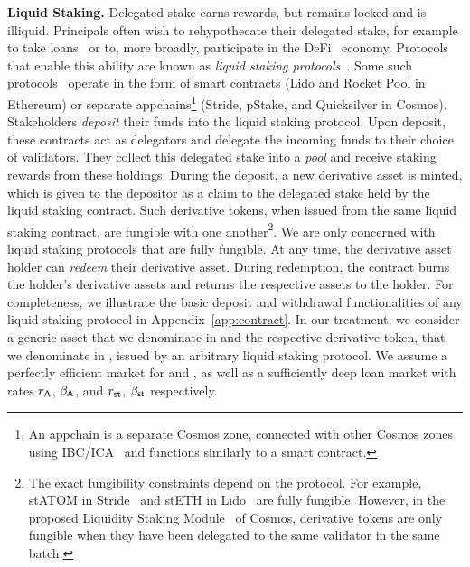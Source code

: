 \noindent
\textbf{Liquid Staking.} Delegated stake earns rewards, but remains locked and
is illiquid. Principals often wish to rehypothecate their delegated stake,
for example to take loans~\cite{gudgeon2020defi} or to, more broadly, participate in the
DeFi~\cite{defi-sok} economy. Protocols that enable this ability are known as
\emph{liquid staking protocols}~\cite{liquid-staking-report}.
Some such protocols~\cite{lido,stride} operate
in the form of smart contracts (\eg Lido and Rocket Pool in Ethereum) or separate
appchains\footnote{An appchain is a separate Cosmos zone, connected with other
Cosmos zones using IBC/ICA~\cite{ibc-ica} and functions similarly to a smart contract.}
(\eg Stride, pStake, and Quicksilver in Cosmos).
Stakeholders \emph{deposit} their funds into the liquid staking protocol.
Upon deposit, these contracts act as
delegators and delegate the incoming funds to their choice of validators.
They collect this delegated stake into a \emph{pool} and receive staking
rewards from these holdings.
During the deposit, a new derivative asset is minted,
which is given to the depositor as a claim to the delegated stake held by the
liquid staking contract. Such derivative tokens, when issued from the same liquid
staking contract, are fungible with one another\footnote{The exact fungibility
constraints depend on the protocol. For example,
\textsf{stATOM} in Stride~\cite{stride} and \textsf{stETH} in Lido~\cite{lido} are fully fungible.
However, in the proposed Liquidity Staking
Module~\cite{liquidity-staking-module} of Cosmos,
derivative tokens are only fungible when they have been
delegated to the same validator in the same batch.}. We are only concerned with liquid
staking protocols that are fully fungible. At any time, the derivative asset holder
can \emph{redeem} their derivative asset.
During redemption, the contract burns
the holder's derivative assets and returns the respective assets to the holder.
For completeness, we illustrate the basic deposit and withdrawal
functionalities of any liquid staking protocol in Appendix~\ref{app:contract}.
In our treatment, we consider a generic asset that we denominate in \asset
and the respective derivative token, that we denominate in \stasset,
issued by an arbitrary liquid staking protocol.
We assume a perfectly efficient market for \asset and \stasset,
as well as a sufficiently deep loan market with rates
$r_{\textsf{A}}$, $\beta_{\textsf{A}}$, and $r_{\textsf{st}}$, $\beta_{\textsf{st}}$ respectively.

